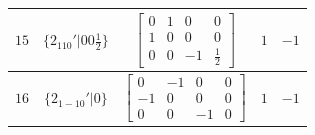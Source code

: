 \documentclass[fleqn,8pt]{jsarticle}
\begin{document}
\begin{longtable}{ccccc}
$ 15 $ & $ \{2{}_{110}{}'|0 0 \frac{1}{2}\} $ & $ \begin{bmatrix} 0 & 1 & 0 & 0 \\ 1 & 0 & 0 & 0 \\ 0 & 0 & -1 & \frac{1}{2} \end{bmatrix} $ & $ 1 $ & $ -1 $ \\ \hline
$ 16 $ & $ \{2{}_{1-10}{}'|0\} $ & $ \begin{bmatrix} 0 & -1 & 0 & 0 \\ -1 & 0 & 0 & 0 \\ 0 & 0 & -1 & 0 \end{bmatrix} $ & $ 1 $ & $ -1 $ \\
\end{longtable}
\end{document}
